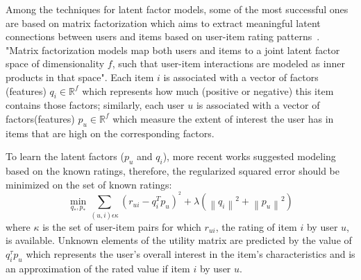 Among the techniques for latent factor models, some of the most successful ones are based on matrix factorization which aims to extract meaningful latent connections between users and items based on user-item rating patterns~\cite{koren2009matrix}. "Matrix factorization models map both users and items to a joint latent factor space of dimensionality $f$, such that user-item interactions are modeled as inner products in that space". Each item $i$ is associated with a vector of factors (features) 
$q_{i}\in \mathbb{R}^{f}$
which represents how much (positive or negative) this item contains those factors; similarly, each user $u$ is associated with a vector of factors(features) 
$p_{u}\in \mathbb{R}^{f}$
which measure the extent of interest the user has in items that are high on the corresponding factors. 


To learn the latent factors ($p_{u}$ and $q_{i}$), more recent works suggested modeling based on the known ratings, therefore, the regularized squared error should be minimized on the set of 
known ratings:
\begin{equation} \tag{1}
   \min_{q_{*},p_{*}} \sum_{(u,i) \epsilon \kappa }  (r_{ui}-q_{i}^{T}p_{u})^{^2}+\lambda \left ( \left \| q_{i}\right \|^2+\left \| p_{u}\right \|^2 \right )            \label{eq}
\end{equation}
where $\kappa$ is the set of user-item pairs for which $r_{ui}$, the rating of item $i$ by user $u$, is available. Unknown elements of the utility matrix are predicted by the value of $q_{i}^{\tau }p_{u}$ which represents the user’s overall interest in the item’s characteristics and is an approximation of the rated value if item $i$ by user $u$. 




